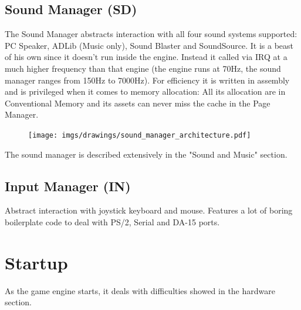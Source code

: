 \documentclass[book.tex]{subfiles}
\begin{document}
\subsection{Sound Manager (SD)}
The Sound Manager abstracts interaction with all four sound systems supported: PC Speaker, ADLib (Music only), Sound Blaster and SoundSource. It is a beast of his own since it doesn't run inside the engine. Instead it called via IRQ at a much higher frequency than that engine (the engine runs at 70Hz, the sound manager ranges from 150Hz to 7000Hz). For efficiency it is written in assembly and is privileged when it comes to memory allocation: All its allocation are in Conventional Memory and its assets can never miss the cache in the Page Manager.\\
 \par
\begin{figure}[H]
\centering
 \texttt{[image: imgs/drawings/sound\_manager\_architecture.pdf]}
 \end{figure}
 \par
The sound manager is described extensively in the "Sound and Music" section.

















\subsection{Input Manager (IN)}
Abstract interaction with joystick keyboard and mouse. Features a lot of boring boilerplate code to deal with PS/2, Serial and DA-15 ports.
















\section{Startup}
As the game engine starts, it deals with difficulties showed in the hardware section.
\end{document}
